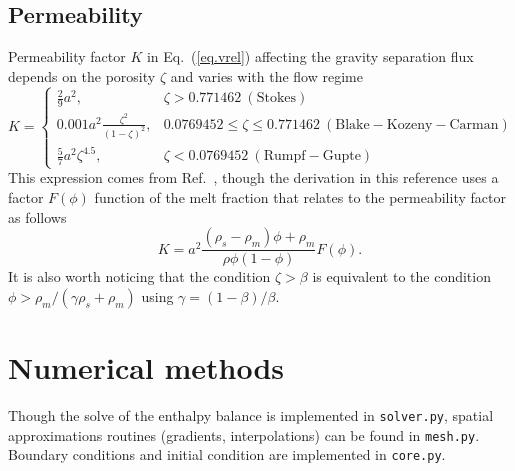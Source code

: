 \documentclass{article}
\begin{document}
\subsection{Permeability}
Permeability factor $K$ in Eq.~(\ref{eq.vrel}) affecting the gravity separation flux depends on the porosity $\zeta$ and varies with the flow regime
\begin{equation}
K=\begin{cases}
    \frac{2}{9}a^2, & \zeta > 0.771462~\mathrm{(Stokes)} \\
    0.001 a^2\frac{\zeta^2}{(1-\zeta)^2}, & 0.0769452 \leq \zeta \leq 0.771462~\mathrm{(Blake-Kozeny-Carman)}\\
    \frac{5}{7}a^2 \zeta^{4.5}, & \zeta < 0.0769452~\mathrm{(Rumpf-Gupte)}
\end{cases}
\end{equation}
This expression comes from Ref.~\cite{ABE93}, though the derivation in this reference uses a factor $F(\phi)$ function of the melt fraction that relates to the permeability factor as follows 
\begin{equation}
    K = a^2\frac{(\rho_s-\rho_m)\phi + \rho_m}{\rho\phi(1-\phi)}F(\phi).
\end{equation}
It is also worth noticing that the condition $\zeta > \beta$ is equivalent to the condition $\phi > \rho_m/(\gamma \rho_s + \rho_m)$ using $\gamma = (1-\beta)/\beta$.

\section{Numerical methods}

Though the solve of the enthalpy balance is implemented in \texttt{solver.py}, spatial approximations routines (gradients, interpolations) can be found in \texttt{mesh.py}. Boundary conditions and initial condition are implemented in \texttt{core.py}.
\end{document}
